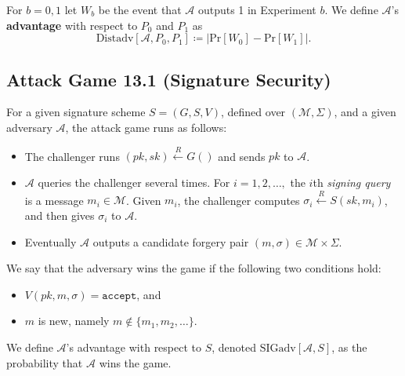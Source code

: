 For $b = 0,1$ let $W_b$ be the event that $\mathcal{A}$ outputs 1 in Experiment $b$.
We define $\mathcal{A}$'s \textbf{advantage} with respect to $P_0$ and $P_1$ as
\begin{equation*}
    \text{Distadv}[\mathcal{A}, P_0, P_1] \coloneqq \left\vert \text{Pr}[W_0] - \text{Pr}[W_1] \right\vert.
\end{equation*}

\subsection{Attack Game 13.1 (Signature Security)} \label{ag:13-1}

For a given signature scheme $S = (G, S, V)$, defined over $(\mathcal{M}, \Sigma)$, and a given adversary $\mathcal{A}$, the attack game runs as follows:
\begin{itemize}
    \item The challenger runs $(pk, sk) \overset{R}{\longleftarrow} G()$ and sends $pk$ to $\mathcal{A}$.
    \item $\mathcal{A}$ queries the challenger several times.
        For $i = 1, 2, \dots,$ the $i$th \textit{signing query} is a message $m_i \in \mathcal{M}$.
        Given $m_i$, the challenger computes $\sigma_i \overset{R}{\longleftarrow} S(sk, m_i)$, and then gives $\sigma_i$ to $\mathcal{A}$.
    \item Eventually $\mathcal{A}$ outputs a candidate forgery pair $(m, \sigma) \in \mathcal{M} \times \Sigma$.
\end{itemize}
We say that the adversary wins the game if the following two conditions hold:
\begin{itemize}
    \item $V(pk, m, \sigma) = \texttt{accept}$, and
    \item $m$ is new, namely $m \not\in \{ m_1, m_2, \dots \}$.
\end{itemize}

We define $\mathcal{A}$'s advantage with respect to $S$, denoted $\text{SIGadv}[\mathcal{A}, S]$, as the probability that $\mathcal{A}$ wins the game.
